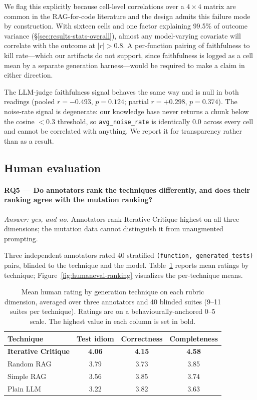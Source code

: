 \documentclass[smallextended]{svjour3}
\begin{document}
We flag this explicitly because cell-level correlations over a
$4 \times 4$ matrix are common in the RAG-for-code literature and
the design admits this failure mode by construction. With sixteen
cells and one factor explaining 99.5\% of outcome variance
(\S\ref{sec:results-stats-overall}), almost any model-varying covariate
will correlate with the outcome at $|r| > 0.8$. A per-function
pairing of faithfulness to kill rate---which our artifacts do not
support, since faithfulness is logged as a cell mean by a separate
generation harness---would be required to make a claim in either
direction.

The LLM-judge faithfulness signal behaves the same way and is null
in both readings (pooled $r = -0.493$, $p = 0.124$; partial
$r = +0.298$, $p = 0.374$). The noise-rate signal is degenerate: our
knowledge base never returns a chunk below the cosine $< 0.3$
threshold, so \texttt{avg\_noise\_rate} is identically $0.0$ across
every cell and cannot be correlated with anything. We report it for
transparency rather than as a result.

\subsection{Human evaluation}\label{sec:results-humaneval}

\paragraph{\textnormal{\textbf{RQ5} --- Do annotators rank the techniques differently, and does their ranking agree with the mutation ranking?}}
\emph{Answer: yes, and no.} Annotators rank Iterative Critique
highest on all three dimensions; the mutation data cannot distinguish
it from unaugmented prompting.


Three independent annotators rated 40 stratified
\texttt{(function, generated\_tests)} pairs, blinded to the technique and
the model. Table~\ref{tab:humaneval-method} reports mean ratings by
technique; Figure~\ref{fig:humaneval-ranking} visualizes the
per-technique means.

\begin{table}[t]
\centering
\caption{Mean human rating by generation technique on each rubric
dimension, averaged over three annotators and 40 blinded suites
(9--11 suites per technique). Ratings are on a behaviourally-anchored
0--5 scale. The highest value in each column is set in bold.}\label{tab:humaneval-method}
\begin{tabular}{@{}lccc@{}}
\toprule
Technique & Test idiom & Correctness & Completeness \\
\midrule
\textbf{Iterative Critique} & \textbf{4.06} & \textbf{4.15} & \textbf{4.58} \\
Random RAG & 3.79 & 3.73 & 3.85 \\
Simple RAG & 3.56 & 3.85 & 3.74 \\
Plain LLM & 3.22 & 3.82 & 3.63 \\
\bottomrule
\end{tabular}
\end{table}
\end{document}
